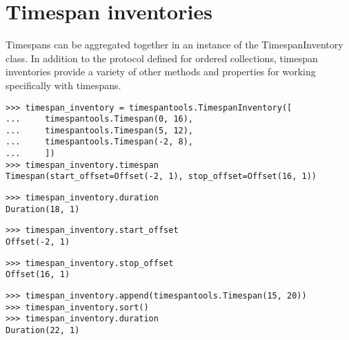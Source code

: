 \section{Timespan inventories}

Timespans can be aggregated together in an instance of the TimespanInventory
class. In addition to the protocol defined for ordered collections, timespan
inventories provide a variety of other methods and properties for working
specifically with timespans.

\begin{comment}
<abjad>
timespan_inventory = timespantools.TimespanInventory([
    timespantools.Timespan(0, 16),
    timespantools.Timespan(5, 12),
    timespantools.Timespan(-2, 8),
    ])
timespan_inventory.timespan
timespan_inventory.duration
timespan_inventory.start_offset
timespan_inventory.stop_offset
timespan_inventory.append(timespantools.Timespan(15, 20))
timespan_inventory.sort()
timespan_inventory.duration
</abjad>
\end{comment}

\begin{singlespacing}
\vspace{-0.5\baselineskip}
\begin{lstlisting}
>>> timespan_inventory = timespantools.TimespanInventory([
...     timespantools.Timespan(0, 16),
...     timespantools.Timespan(5, 12),
...     timespantools.Timespan(-2, 8),
...     ])
>>> timespan_inventory.timespan
Timespan(start_offset=Offset(-2, 1), stop_offset=Offset(16, 1))
\end{lstlisting}
\begin{lstlisting}
>>> timespan_inventory.duration
Duration(18, 1)
\end{lstlisting}
\begin{lstlisting}
>>> timespan_inventory.start_offset
Offset(-2, 1)
\end{lstlisting}
\begin{lstlisting}
>>> timespan_inventory.stop_offset
Offset(16, 1)
\end{lstlisting}
\begin{lstlisting}
>>> timespan_inventory.append(timespantools.Timespan(15, 20))
>>> timespan_inventory.sort()
>>> timespan_inventory.duration
Duration(22, 1)
\end{lstlisting}
\end{singlespacing}

